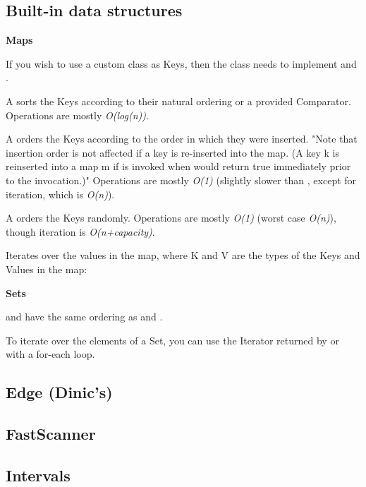 
\subsection*{Built-in data structures}

\textbf{Maps}

If you wish to use a custom class as Keys, then the class needs to implement  and .

A  sorts the Keys according to their natural ordering or a provided Comparator. Operations are mostly \textit{O(log(n))}.

A  orders the Keys according to the order in which they were inserted. "Note that insertion order is not affected if a key is re-inserted into the map. (A key k is reinserted into a map m if  is invoked when  would return true immediately prior to the invocation.)" Operations are mostly \textit{O(1)} (slightly slower than , except for iteration, which is \textit{O(n)}).

A  orders the Keys randomly. Operations are mostly \textit{O(1)} (worst case \textit{O(n)}), though iteration is \textit{O(n+capacity)}.

Iterates over the values in the map, where K and V are the types of the Keys and Values in the map:



\textbf{Sets}

 and  have the same ordering as  and .

To iterate over the elements of a Set, you can use the Iterator returned by  or with a for-each loop.

\subsection*{Edge (Dinic's)}



\subsection*{FastScanner}



\subsection*{Intervals}




\newpage